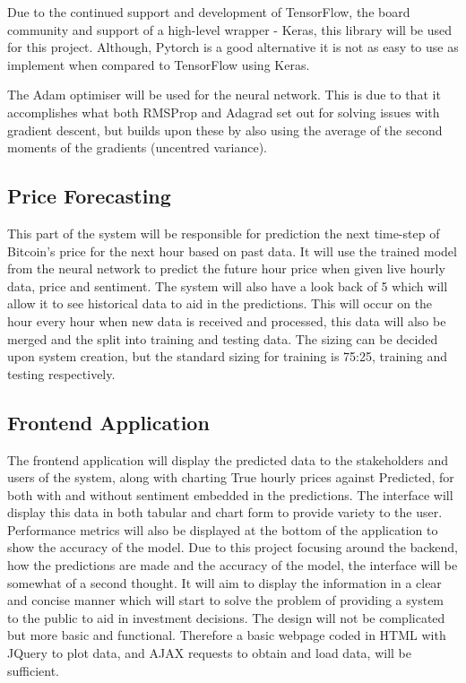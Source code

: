 \documentclass[oneside, 12pt]{article}
\begin{document}
		Due to the continued support and development of TensorFlow, the board community and support of a high-level wrapper - Keras, this library will be used for this project. Although, Pytorch is a good alternative it is not as easy to use as implement when compared to TensorFlow using Keras.
		
		The Adam optimiser will be used for the neural network. This is due to that it accomplishes what both RMSProp and Adagrad set out for solving issues with gradient descent, but builds upon these by also using the average of the second moments of the gradients (uncentred variance).
		
		\subsection{Price Forecasting}
		This part of the system will be responsible for prediction the next time-step of Bitcoin's price for the next hour based on past data. It will use the trained model from the neural network to predict the future hour price when given live hourly data, price and sentiment. The system will also have a look back of 5 which will allow it to see historical data to aid in the predictions. This will occur on the hour every hour when new data is received and processed, this data will also be merged and the split into training and testing data. The sizing can be decided upon system creation, but the standard sizing for training is 75:25, training and testing respectively.
		
		\subsection{Frontend Application}
		The frontend application will display the predicted data to the stakeholders and users of the system, along with charting True hourly prices against Predicted, for both with and without sentiment embedded in the predictions. The interface will display this data in both tabular and chart form to provide variety to the user. Performance metrics will also be displayed at the bottom of the application to show the accuracy of the model. Due to this project focusing around the backend, how the predictions are made and the accuracy of the model, the interface will be somewhat of a second thought. It will aim to display the information in a clear and concise manner which will start to solve the problem of providing a system to the public to aid in investment decisions. The design will not be complicated but more basic and functional. Therefore a basic webpage coded in HTML with JQuery to plot data, and AJAX requests to obtain and load data, will be sufficient.
	
\end{document}
